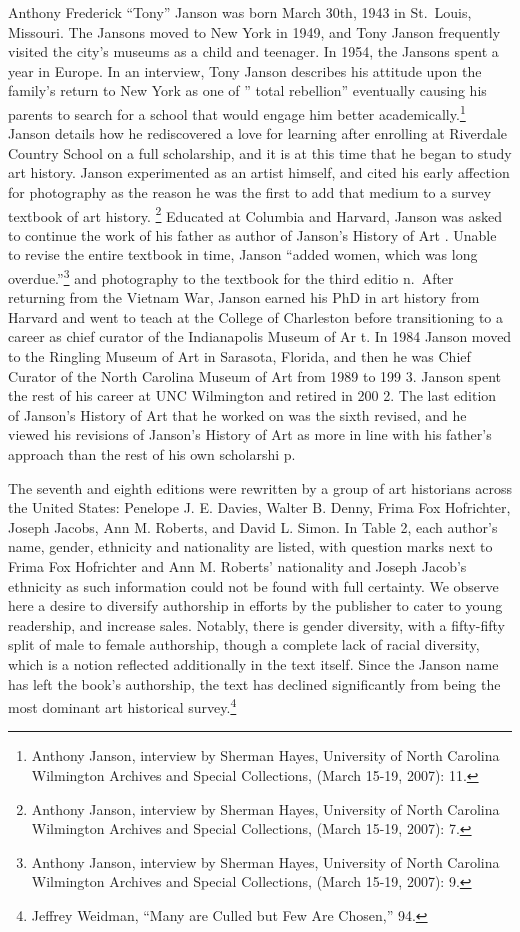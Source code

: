 \documentclass[
  letterpaper,
  DIV=11,
  numbers=noendperiod]{scrreprt}
\begin{document}
Anthony Frederick ``Tony'' Janson was born March 30th, 1943 in
St.~Louis, Missouri. The Jansons moved to New York in 1949, and Tony
Janson frequently visited the city's museums as a child and teenager. In
1954, the Jansons spent a year in Europe. In an interview, Tony Janson
describes his attitude upon the family's return to New York as one of ''
total rebellion'' eventually causing his parents to search for a school
that would engage him better academically.\footnote{Anthony Janson,
  interview by Sherman Hayes, University of North Carolina Wilmington
  Archives and Special Collections, (March 15-19, 2007): 11.} Janson
details how he rediscovered a love for learning after enrolling at
Riverdale Country School on a full scholarship, and it is at this time
that he began to study art history. Janson experimented as an artist
himself, and cited his early affection for photography as the reason he
was the first to add that medium to a survey textbook of art history.
\footnote{Anthony Janson, interview by Sherman Hayes, University of
  North Carolina Wilmington Archives and Special Collections, (March
  15-19, 2007): 7.} Educated at Columbia and Harvard, Janson was asked
to continue the work of his father as author of Janson's History of Art
. Unable to revise the entire textbook in time, Janson ``added women,
which was long overdue.''\footnote{Anthony Janson, interview by Sherman
  Hayes, University of North Carolina Wilmington Archives and Special
  Collections, (March 15-19, 2007): 9.} and photography to the textbook
for the third editio n.~After returning from the Vietnam War, Janson
earned his PhD in art history from Harvard and went to teach at the
College of Charleston before transitioning to a career as chief curator
of the Indianapolis Museum of Ar t. In 1984 Janson moved to the Ringling
Museum of Art in Sarasota, Florida, and then he was Chief Curator of the
North Carolina Museum of Art from 1989 to 199 3. Janson spent the rest
of his career at UNC Wilmington and retired in 200 2. The last edition
of Janson's History of Art that he worked on was the sixth revised, and
he viewed his revisions of Janson's History of Art as more in line with
his father's approach than the rest of his own scholarshi p.

The seventh and eighth editions were rewritten by a group of art
historians across the United States: Penelope J. E. Davies, Walter B.
Denny, Frima Fox Hofrichter, Joseph Jacobs, Ann M. Roberts, and David L.
Simon. In Table 2, each author's name, gender, ethnicity and nationality
are listed, with question marks next to Frima Fox Hofrichter and Ann M.
Roberts' nationality and Joseph Jacob's ethnicity as such information
could not be found with full certainty. We observe here a desire to
diversify authorship in efforts by the publisher to cater to young
readership, and increase sales. Notably, there is gender diversity, with
a fifty-fifty split of male to female authorship, though a complete lack
of racial diversity, which is a notion reflected additionally in the
text itself. Since the Janson name has left the book's authorship, the
text has declined significantly from being the most dominant art
historical survey.\footnote{Jeffrey Weidman, ``Many are Culled but Few
  Are Chosen,'' 94.}
\end{document}
